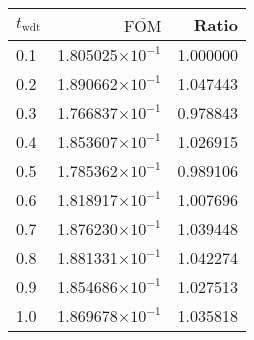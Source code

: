\begin{tabular}{lrr}
\toprule
$t_{\mathrm{wdt}}$ & $\overline{\mathrm{FOM}}$ &    Ratio \\
\midrule
               0.1 &  1.805025$\times 10^{-1}$ & 1.000000 \\
               0.2 &  1.890662$\times 10^{-1}$ & 1.047443 \\
               0.3 &  1.766837$\times 10^{-1}$ & 0.978843 \\
               0.4 &  1.853607$\times 10^{-1}$ & 1.026915 \\
               0.5 &  1.785362$\times 10^{-1}$ & 0.989106 \\
               0.6 &  1.818917$\times 10^{-1}$ & 1.007696 \\
               0.7 &  1.876230$\times 10^{-1}$ & 1.039448 \\
               0.8 &  1.881331$\times 10^{-1}$ & 1.042274 \\
               0.9 &  1.854686$\times 10^{-1}$ & 1.027513 \\
               1.0 &  1.869678$\times 10^{-1}$ & 1.035818 \\
\bottomrule
\end{tabular}
